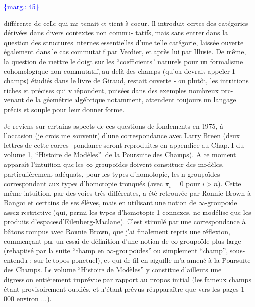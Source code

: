 \documentclass[11pt]{article}
\newcommand{\scanpage}[1]{\par\bigskip\noindent{\small\sffamily[scan #1]}\par}
\newcommand{\mspage}[1]{{\small\sffamily[p.\,#1]}}
\newcommand{\margin}[1]{\textcolor{blue}{\{\textsf{marg.:} #1\}}}
\newcommand{\uline}[1]{\underline{#1}}
\begin{document}
\margin{45}

\clearpage
\scanpage{119/46}
\mspage{44}

différente de celle qui me tenait et tient à coeur. Il introduit
certes des catégories dérivées dans divers contextes non commu-%
tatifs, mais sans entrer dans la question des structures internes
essentielles d'une telle catégorie, laissée ouverte également
dans le cas commutatif par Verdier, et après lui par Illusie. De
même, la question de mettre le doigt sur les ``coefficients''
naturels pour un formalisme cohomologique non commutatif, au delà
des champs (qu'on devrait appeler 1-champs) étudiés dans le livre
de Giraud, restait ouverte - ou plutôt, les intuitions riches et
précises qui y répondent, puisées dans des exemples nombreux pro-%
venant de la géométrie algébrique notamment, attendent toujours
un langage précis et souple pour leur donner forme.

Je reviens sur certains aspects de ces questions de
fondements en 1975, à l'occasion (je crois me souvenir) d'une
correspondance avec Larry Breen (deux lettres de cette corres-%
pondance seront reproduites en appendice au Chap. I du volume 1,
``Histoire de Modèles'', de la Poursuite des Champs). A ce moment
apparaît l'intuition que les $\infty$-groupoïdes doivent constituer des
modèles, particulièrement adéquats, pour les types d'homotopie,
les n-groupoïdes correspondant aux types d'homotopie \uline{tronqués}
(avec $\pi_i = 0$ pour $i > n$). Cette même intuition, par des voies
très différentes, a été retrouvée par Ronnie Brown à Bangor et
certains de ses élèves, mais en utilisant une notion de $\infty$-groupoïde
assez restrictive (qui, parmi les types d'homotopie 1-connexes,
ne modélise que les produits d'espacesd'Eilenberg-Maclane). C'est
stimulé par une correspondance à bâtons rompus avec Ronnie Brown,
que j'ai finalement repris une réflexion, commençant par un essai
de définition d'une notion de $\infty$-groupoïde plus large (rebaptisé
par la suite ``champ en $\infty$-groupoïdes'' ou simplement ``champ'', sous-%
entendu : sur le topos ponctuel), et qui de fil en aiguille m'a
amené à la Poursuite des Champs. Le volume ``Histoire de Modèles''
y constitue d'ailleurs une digression entièrement imprévue par
rapport au propos initial (les fameux champs étant provisoirement
oubliés, et n'étant prévus réapparaître que vers les pages 1 000
environ ...).
\end{document}
